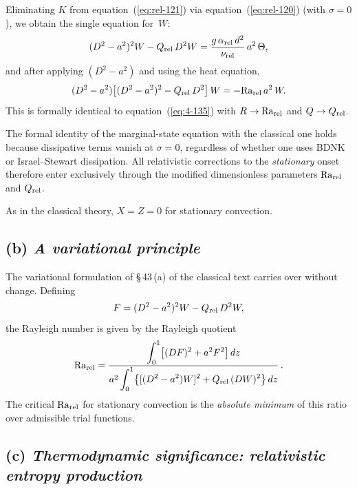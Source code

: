 Eliminating $K$ from equation~(\ref{eq:rel-121}) via
equation~(\ref{eq:rel-120}) (with $\sigma=0$), we obtain the
single equation for~$W$:
\begin{equation}\label{eq:rel-133}
  (D^{2}-a^{2})^{2}W - Q_{\mathrm{rel}}\,D^{2}W
  = \frac{g\,\alpha_{\text{rel}}\,d^{2}}{\nu_{\text{rel}}}\,
    a^{2}\,\Theta,
\end{equation}
and after applying $(D^{2}-a^{2})$ and using the heat equation,
\begin{equation}\label{eq:rel-135}
  (D^{2}-a^{2})\bigl[(D^{2}-a^{2})^{2}-Q_{\mathrm{rel}}\,D^{2}\bigr]\,W
  = -\mathrm{Ra}_{\mathrm{rel}}\,a^{2}\,W.
\end{equation}
This is formally identical to equation~(\ref{eq:4-135}) with
$R\to\mathrm{Ra}_{\mathrm{rel}}$ and $Q\to Q_{\mathrm{rel}}$.

\begin{relcorrection}
The formal identity of the marginal-state equation with the
classical one holds because dissipative terms vanish at $\sigma=0$,
regardless of whether one uses BDNK or Israel--Stewart dissipation.
All relativistic corrections to the \emph{stationary} onset
therefore enter exclusively through the modified dimensionless
parameters $\mathrm{Ra}_{\mathrm{rel}}$ and $Q_{\mathrm{rel}}$.
\end{relcorrection}

As in the classical theory, $X=Z=0$ for stationary convection.

\subsection*{(b) \emph{A variational principle}}

The variational formulation of \S\,43\,(a) of the classical text
carries over without change.  Defining
\begin{equation}\label{eq:rel-141}
  F = (D^{2}-a^{2})^{2}W - Q_{\mathrm{rel}}\,D^{2}W,
\end{equation}
the Rayleigh number is given by the Rayleigh quotient
\begin{equation}\label{eq:rel-147}
  \mathrm{Ra}_{\mathrm{rel}}
  = \frac{\displaystyle
      \int_{0}^{1}\bigl[(DF)^{2}+a^{2}F^{2}\bigr]\,dz}
    {a^{2}\displaystyle
      \int_{0}^{1}\bigl\{[(D^{2}-a^{2})W]^{2}
                         +Q_{\mathrm{rel}}\,(DW)^{2}\bigr\}\,dz}\,.
\end{equation}
The critical $\mathrm{Ra}_{\mathrm{rel}}$ for stationary convection is the
\emph{absolute minimum} of this ratio over admissible trial
functions.

\subsection*{(c) \emph{Thermodynamic significance: relativistic
  entropy production}}

